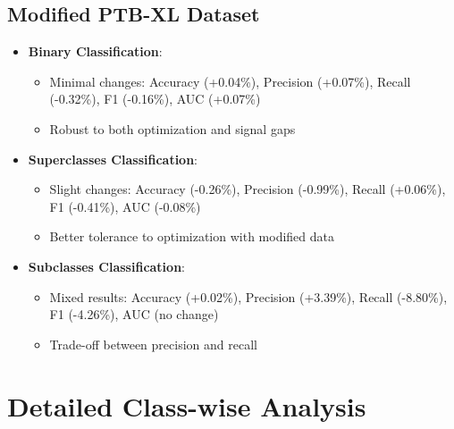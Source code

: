 \documentclass[12pt,a4paper]{article}
\begin{document}
\subsection{Modified PTB-XL Dataset}
\begin{itemize}
    \item \textbf{Binary Classification}:
    \begin{itemize}
        \item Minimal changes: Accuracy (+0.04\%), Precision (+0.07\%), Recall (-0.32\%), F1 (-0.16\%), AUC (+0.07\%)
        \item Robust to both optimization and signal gaps
    \end{itemize}
    
    \item \textbf{Superclasses Classification}:
    \begin{itemize}
        \item Slight changes: Accuracy (-0.26\%), Precision (-0.99\%), Recall (+0.06\%), F1 (-0.41\%), AUC (-0.08\%)
        \item Better tolerance to optimization with modified data
    \end{itemize}
    
    \item \textbf{Subclasses Classification}:
    \begin{itemize}
        \item Mixed results: Accuracy (+0.02\%), Precision (+3.39\%), Recall (-8.80\%), F1 (-4.26\%), AUC (no change)
        \item Trade-off between precision and recall
    \end{itemize}
\end{itemize}

\section{Detailed Class-wise Analysis}
\end{document}
